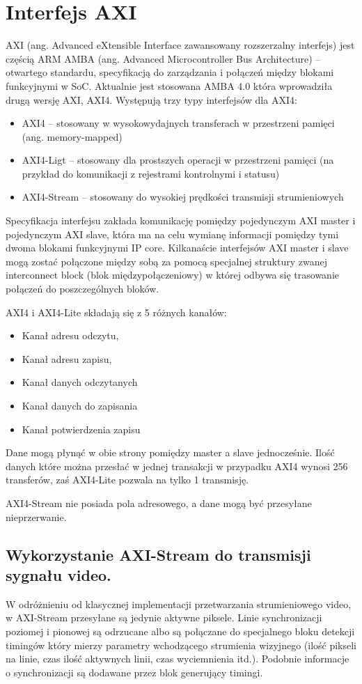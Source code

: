 \section{Interfejs AXI}
 AXI (ang. Advanced eXtensible Interface zawansowany rozszerzalny interfejs) jest częścią ARM AMBA (ang. Advanced Microcontroller Bus Architecture) – otwartego standardu, specyfikacją do zarządzania i połączeń między blokami funkcyjnymi w SoC. Aktualnie jest stosowana AMBA 4.0 która wprowadziła drugą wersję AXI, AXI4. Występują trzy typy interfejsów dla AXI4:
\begin{itemize}
\item AXI4 – stosowany w wysokowydajnych transferach w przestrzeni pamięci (ang. memory-mapped)
\item AXI4-Ligt – stosowany dla prostszych operacji w przestrzeni pamięci (na przykład do komunikacji z rejestrami kontrolnymi i statusu)
\item AXI4-Stream – stosowany do wysokiej prędkości transmisji strumieniowych
\end{itemize}
Specyfikacja interfejsu zakłada komunikację pomiędzy pojedynczym AXI master i pojedynczym AXI slave, która ma na celu wymianę informacji pomiędzy tymi dwoma blokami funkcyjnymi IP core. Kilkanaście interfejsów AXI master i slave mogą zostać połączone między sobą za pomocą specjalnej struktury zwanej interconnect block (blok międzypołączeniowy) w której odbywa się trasowanie połączeń do poszczególnych bloków. 

AXI4 i AXI4-Lite składają się z 5 różnych kanałów:
\begin{itemize}
\item Kanał adresu odczytu,
\item Kanał adresu zapisu,
\item Kanał danych odczytanych
\item Kanał danych do zapisania
\item Kanał potwierdzenia zapisu
\end{itemize}
Dane mogą płynąć w obie strony pomiędzy master a slave jednocześnie. Ilość danych które można przesłać w jednej transakcji w przypadku AXI4 wynosi 256 transferów, zaś AXI4-Lite pozwala na tylko 1 transmisję.

AXI4-Stream nie posiada pola adresowego, a dane mogą być przesyłane nieprzerwanie. 
\subsection{Wykorzystanie AXI-Stream do transmisji sygnału video.} 
W odróżnieniu od klasycznej implementacji przetwarzania strumieniowego video, w AXI-Stream przesyłane są jedynie aktywne piksele. Linie synchronizacji poziomej i pionowej są odrzucane albo są połączane do specjalnego bloku detekcji timingów który mierzy parametry wchodzącego strumienia wizyjnego (ilość pikseli na linie, czas ilość aktywnych linii, czas wyciemnienia itd.). Podobnie informacje o synchronizacji są dodawane przez blok generujący timingi.

